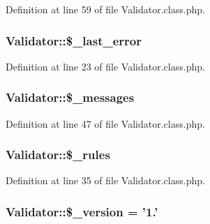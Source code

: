 Definition at line 59 of file Validator.\+class.\+php.

\hypertarget{classValidator_a1b957a11848d8cb550fc578052f49588}{
\subsubsection[{\$\+\_\+last\+\_\+error}]{\setlength{\rightskip}{0pt plus 5cm}Validator\+::\$\+\_\+last\+\_\+error}}\label{classValidator_a1b957a11848d8cb550fc578052f49588}


Definition at line 23 of file Validator.\+class.\+php.

\hypertarget{classValidator_ac9f1f384dc723b2a4581e83066fba49c}{
\subsubsection[{\$\+\_\+messages}]{\setlength{\rightskip}{0pt plus 5cm}Validator\+::\$\+\_\+messages}}\label{classValidator_ac9f1f384dc723b2a4581e83066fba49c}


Definition at line 47 of file Validator.\+class.\+php.

\hypertarget{classValidator_ab0ec00f502a96e6c95d963fe8cf40c00}{
\subsubsection[{\$\+\_\+rules}]{\setlength{\rightskip}{0pt plus 5cm}Validator\+::\$\+\_\+rules}}\label{classValidator_ab0ec00f502a96e6c95d963fe8cf40c00}


Definition at line 35 of file Validator.\+class.\+php.

\hypertarget{classValidator_af3e80f6437543d50f58f1e5269900068}{
\subsubsection[{\$\+\_\+version}]{\setlength{\rightskip}{0pt plus 5cm}Validator\+::\$\+\_\+version = '1.'}}\label{classValidator_af3e80f6437543d50f58f1e5269900068}



